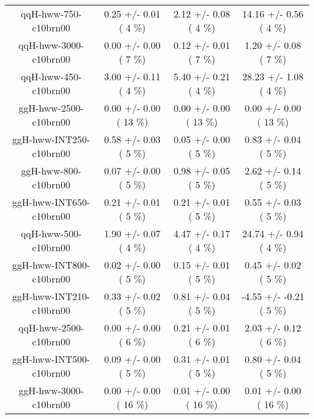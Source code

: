 \begin{table}[h!]
\begin{center}
{\begin{tabular}{
c| c | c | c | }
 qqH-hww-750-c10brn00   &       0.25 +/-       0.01 (         4 \%)   &       2.12 +/-       0.08 (         4 \%)   &      14.16 +/-       0.56 (         4 \%)  \\
 qqH-hww-3000-c10brn00   &       0.00 +/-       0.00 (         7 \%)   &       0.12 +/-       0.01 (         7 \%)   &       1.20 +/-       0.08 (         7 \%)  \\
 qqH-hww-450-c10brn00   &       3.00 +/-       0.11 (         4 \%)   &       5.40 +/-       0.21 (         4 \%)   &      28.23 +/-       1.08 (         4 \%)  \\
 ggH-hww-2500-c10brn00   &       0.00 +/-       0.00 (        13 \%)   &       0.00 +/-       0.00 (        13 \%)   &       0.00 +/-       0.00 (        13 \%)  \\
 ggH-hww-INT250-c10brn00   &       0.58 +/-       0.03 (         5 \%)   &       0.05 +/-       0.00 (         5 \%)   &       0.83 +/-       0.04 (         5 \%)  \\
 ggH-hww-800-c10brn00   &       0.07 +/-       0.00 (         5 \%)   &       0.98 +/-       0.05 (         5 \%)   &       2.62 +/-       0.14 (         5 \%)  \\
 ggH-hww-INT650-c10brn00   &       0.21 +/-       0.01 (         5 \%)   &       0.21 +/-       0.01 (         5 \%)   &       0.55 +/-       0.03 (         5 \%)  \\
 qqH-hww-500-c10brn00   &       1.90 +/-       0.07 (         4 \%)   &       4.47 +/-       0.17 (         4 \%)   &      24.74 +/-       0.94 (         4 \%)  \\
 ggH-hww-INT800-c10brn00   &       0.02 +/-       0.00 (         5 \%)   &       0.15 +/-       0.01 (         5 \%)   &       0.45 +/-       0.02 (         5 \%)  \\
 ggH-hww-INT210-c10brn00   &       0.33 +/-       0.02 (         5 \%)   &       0.81 +/-       0.04 (         5 \%)   &      -4.55 +/-      -0.21 (         5 \%)  \\
 qqH-hww-2500-c10brn00   &       0.00 +/-       0.00 (         6 \%)   &       0.21 +/-       0.01 (         6 \%)   &       2.03 +/-       0.12 (         6 \%)  \\
 ggH-hww-INT500-c10brn00   &       0.09 +/-       0.00 (         5 \%)   &       0.31 +/-       0.01 (         5 \%)   &       0.80 +/-       0.04 (         5 \%)  \\
 ggH-hww-3000-c10brn00   &       0.00 +/-       0.00 (        16 \%)   &       0.01 +/-       0.00 (        16 \%)   &       0.01 +/-       0.00 (        16 \%)  \\

\end{tabular}}
\end{center}
\end{table}
